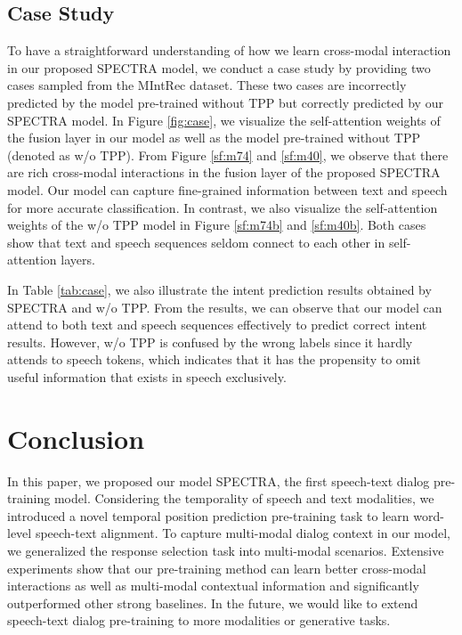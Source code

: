 \documentclass[11pt]{article}
\begin{document}
\subsection{Case Study}
To have a straightforward understanding of how we learn cross-modal interaction in our proposed SPECTRA model, we conduct a case study by providing two cases sampled from the MIntRec dataset. These two cases are incorrectly predicted by the model pre-trained without TPP but correctly predicted by our SPECTRA model.
In Figure \ref{fig:case}, we visualize the self-attention weights of the fusion layer in our model as well as the model pre-trained without TPP (denoted as w/o TPP). From Figure \ref{sf:m74} and \ref{sf:m40}, we observe that there are rich cross-modal interactions in the fusion layer of the proposed SPECTRA model. Our model can capture fine-grained information between text and speech for more accurate classification.
In contrast, we also visualize the self-attention weights of the w/o TPP model in Figure \ref{sf:m74b} and \ref{sf:m40b}. Both cases show that text and speech sequences seldom connect to each other in self-attention layers. 

In Table \ref{tab:case}, we also illustrate the intent prediction results obtained by SPECTRA and w/o TPP. From the results, we can observe that our model can attend to both text and speech sequences effectively to predict correct intent results. However, w/o TPP is confused by the wrong labels since it hardly attends to speech tokens, which indicates that it has the propensity to omit useful information that exists in speech exclusively. 









\section{Conclusion}
In this paper, we proposed our model SPECTRA, the first speech-text dialog pre-training model. Considering the temporality of speech and text modalities, we introduced a novel temporal position prediction pre-training task to learn word-level speech-text alignment. To capture multi-modal dialog context in our model, we generalized the response selection task into multi-modal scenarios. Extensive experiments show that our pre-training method can learn better cross-modal interactions as well as multi-modal contextual information and significantly outperformed other strong baselines. In the future, 
we would like to extend speech-text dialog pre-training to more modalities or generative tasks.
\end{document}
